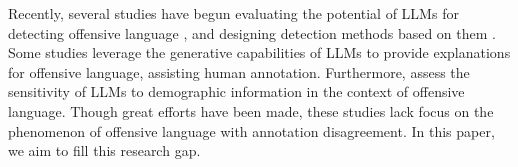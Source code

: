 Recently, several studies have begun evaluating the potential of LLMs for detecting offensive language \cite{DBLP:conf/icwsm/0006AD24, DBLP:conf/emnlp/RoyH0S23}, and designing detection methods based on them \cite{DBLP:conf/emnlp/ParkKJPH24, DBLP:conf/emnlp/WenKSZLBH23}. 
Some studies \cite{DBLP:conf/ijcai/WangHACL23, DBLP:conf/www/HuangKA23a} leverage the generative capabilities of LLMs to provide explanations for offensive language, assisting human annotation. 
Furthermore, \citet{DBLP:journals/corr/abs-2410-07991, DBLP:conf/acl/ZhangHJL24} assess the sensitivity of LLMs to demographic information in the context of offensive language.
Though great efforts have been made, these studies lack focus on the phenomenon of offensive language with annotation disagreement.
In this paper, we aim to fill this research gap.